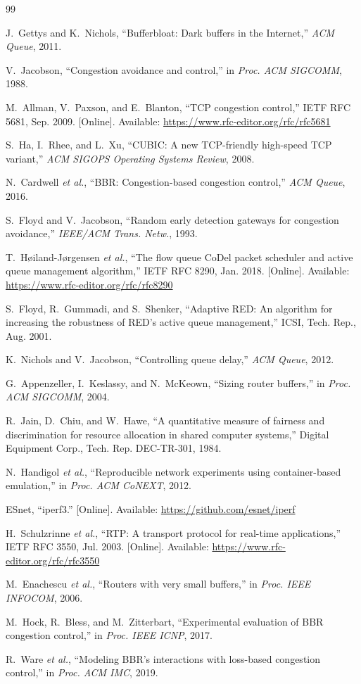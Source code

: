 \documentclass[conference,12pt,letterpaper]{IEEEtran}
\begin{document}
\begin{thebibliography}{99}

J.~Gettys and K.~Nichols, ``Bufferbloat: Dark buffers in the Internet,'' \emph{ACM Queue}, 2011.

V.~Jacobson, ``Congestion avoidance and control,'' in \emph{Proc. ACM SIGCOMM}, 1988.

M.~Allman, V.~Paxson, and E.~Blanton, ``TCP congestion control,'' IETF RFC 5681, Sep. 2009. [Online]. Available: \url{https://www.rfc-editor.org/rfc/rfc5681}

S.~Ha, I.~Rhee, and L.~Xu, ``CUBIC: A new TCP-friendly high-speed TCP variant,'' \emph{ACM SIGOPS Operating Systems Review}, 2008.

N.~Cardwell \emph{et al.}, ``BBR: Congestion-based congestion control,'' \emph{ACM Queue}, 2016.

S.~Floyd and V.~Jacobson, ``Random early detection gateways for congestion avoidance,'' \emph{IEEE/ACM Trans. Netw.}, 1993.

T.~H{\o}iland-J{\o}rgensen \emph{et al.}, ``The flow queue CoDel packet scheduler and active queue management algorithm,'' IETF RFC 8290, Jan. 2018. [Online]. Available: \url{https://www.rfc-editor.org/rfc/rfc8290}

S.~Floyd, R.~Gummadi, and S.~Shenker, ``Adaptive RED: An algorithm for increasing the robustness of RED's active queue management,'' ICSI, Tech. Rep., Aug. 2001.

K.~Nichols and V.~Jacobson, ``Controlling queue delay,'' \emph{ACM Queue}, 2012.

G.~Appenzeller, I.~Keslassy, and N.~McKeown, ``Sizing router buffers,'' in \emph{Proc. ACM SIGCOMM}, 2004.

R.~Jain, D.~Chiu, and W.~Hawe, ``A quantitative measure of fairness and discrimination for resource allocation in shared computer systems,'' Digital Equipment Corp., Tech. Rep. DEC-TR-301, 1984.

N.~Handigol \emph{et al.}, ``Reproducible network experiments using container-based emulation,'' in \emph{Proc. ACM CoNEXT}, 2012.

ESnet, ``iperf3.'' [Online]. Available: \url{https://github.com/esnet/iperf}

H.~Schulzrinne \emph{et al.}, ``RTP: A transport protocol for real-time applications,'' IETF RFC 3550, Jul. 2003. [Online]. Available: \url{https://www.rfc-editor.org/rfc/rfc3550}

M.~Enachescu \emph{et al.}, ``Routers with very small buffers,'' in \emph{Proc. IEEE INFOCOM}, 2006.

M.~Hock, R.~Bless, and M.~Zitterbart, ``Experimental evaluation of BBR congestion control,'' in \emph{Proc. IEEE ICNP}, 2017.

R.~Ware \emph{et al.}, ``Modeling BBR's interactions with loss-based congestion control,'' in \emph{Proc. ACM IMC}, 2019.

\end{thebibliography}
\end{document}
